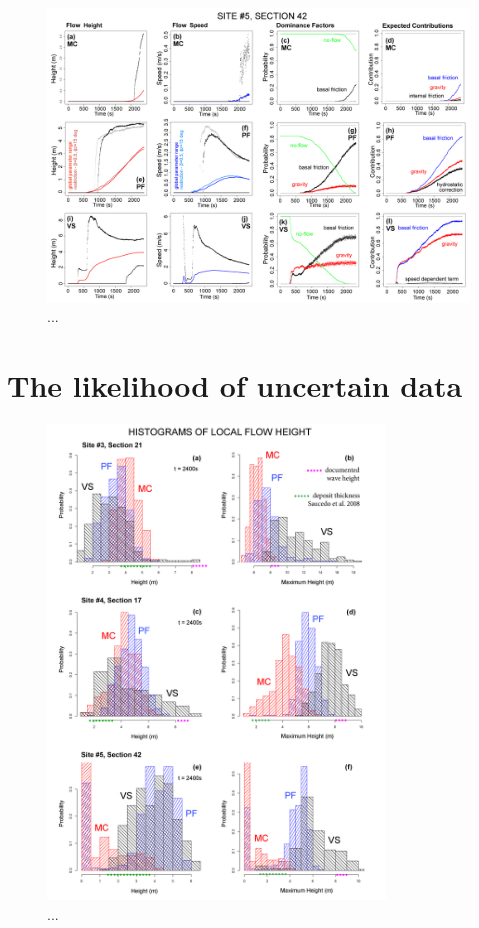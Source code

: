 \documentclass{article}
\begin{document}
\begin{figure}[H]
\centering
\includegraphics[width=1\textwidth]{Fig7.png}
\caption{...}
\label{Fig7}
\end{figure}

\section{The likelihood of uncertain data}

\begin{figure}[H]
\centering
\includegraphics[width=0.8\textwidth]{Fig8.png}
\caption{...}
\label{Fig8}
\end{figure}
\end{document}
